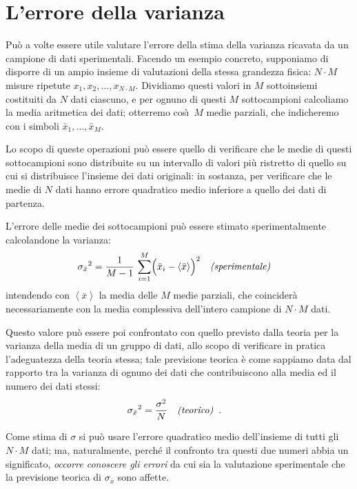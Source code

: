 
\chapter{L'errore della varianza}%
\label{ch:b.errvar}
Pu\`o a volte essere utile valutare l'errore della stima
della varianza ricavata da un campione di dati sperimentali.
Facendo un esempio concreto, supponiamo di disporre di un
ampio insieme di valutazioni della stessa grandezza fisica:
$N \cdot M$ misure ripetute $x_1, x_2,\ldots, x_{N \cdot M}
$.  Dividiamo questi valori in $M$ sottoinsiemi costituiti
da $N$ dati ciascuno, e per ognuno di questi $M$
sottocampioni calcoliamo la media aritmetica dei dati;
otterremo cos\`\i\ $M$ medie parziali, che indicheremo con i
simboli $ \bar x_1, \ldots, \bar x_M $.

Lo scopo di queste operazioni pu\`o essere quello di
verificare che le medie di questi sottocampioni sono
distribuite su un intervallo di valori pi\`u ristretto di
quello su cui si distribuisce l'insieme dei dati originali:
in sostanza, per verificare che le medie di $N$ dati hanno
errore quadratico medio inferiore a quello dei dati di
partenza.

L'errore delle medie dei sottocampioni pu\`o essere stimato
sperimentalmente calcolandone la varianza:
\begin{align*}
  {\sigma_{\bar x}}^2 &= \frac{1}{M-1} \,
    \sum_{i=1}^M \Bigl( \bar x_i - \left< \bar x
    \right> \Bigr) ^2 && \text{\itshape (sperimentale)}
\end{align*}
intendendo con $ \left< \bar x \right> $ la media delle $M$
medie parziali, che coincider\`a necessariamente con la
media complessiva dell'intero campione di $N \cdot M$ dati.

Questo valore pu\`o essere poi confrontato con quello
previsto dalla teoria per la varianza della media di un
gruppo di dati, allo scopo di verificare in pratica
l'adeguatezza della teoria stessa; tale previsione teorica
\`e come sappiamo data dal rapporto tra la varianza di
ognuno dei dati che contribuiscono alla media ed il numero
dei dati stessi:
\begin{align*}
  {\sigma_{\bar x}}^2 &= \frac{\sigma^2}{N}
    && \text{\itshape (teorico)} \;\; .
\end{align*}

Come stima di $\sigma$ si pu\`o usare l'errore quadratico
medio dell'insieme di tutti gli $N \cdot M$ dati; ma,
naturalmente, perch\'e il confronto tra questi due numeri
abbia un significato, \emph{occorre conoscere gli errori} da
cui sia la valutazione sperimentale che la previsione
teorica di $\sigma_{\bar x}$ sono affette.

